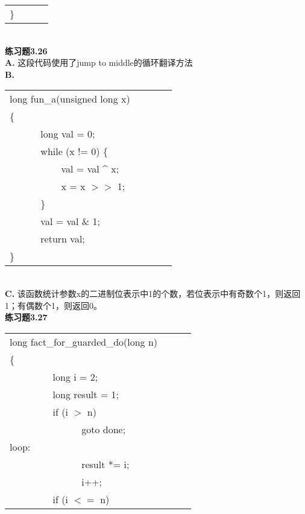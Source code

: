 \documentclass{article}
\begin{document}
\begin{CJK}{UTF8}{uyhei}
\begin{table}[ht]
\begin{tabular}{m{2em}m{2em}m{2em}l}
\}	\\
\end{tabular}
\end{table}	\\
\textbf{练习题3.26}	\\[1ex]
\textbf{A. }这段代码使用了jump to middle的循环翻译方法	\\
\newpage
\noindent\textbf{B. }	\\[-3ex]
\begin{table}[htbp]
\begin{tabular}{m{2em}m{2em}m{2em}l}
	\multicolumn{3}{l}{long fun\_a(unsigned long x)}	\\
\{	\\
	&	\multicolumn{3}{l}{long val = 0;}	\\
	&	\multicolumn{3}{l}{ while (x != 0) \{ } 	\\
	&	&	\multicolumn{2}{l}{val = val \^{} x;}	\\
	&	&	\multicolumn{2}{l}{x = x $>>$ 1;}	\\
	&	\multicolumn{3}{l}{ \} } 	\\
	&	\multicolumn{3}{l}{val = val \& 1;} 	\\
	&	\multicolumn{3}{l}{return val;} 	\\
\}	\\
\end{tabular}
\end{table}	\\
\textbf{C. }该函数统计参数x的二进制位表示中1的个数，若位表示中有奇数个1，则返回1；有偶数个1，则返回0。	\\[2ex]
\textbf{练习题3.27}	\\[-3ex]
\begin{table}[ht]
\begin{tabular}{m{2em}m{2em}m{2em}l}
	\multicolumn{3}{l}{long fact\_for\_guarded\_do(long n)}	\\
\{	\\
	&	\multicolumn{3}{l}{long i = 2;}	\\
	&	\multicolumn{3}{l}{long result = 1;}	\\
	&	\multicolumn{3}{l}{ if (i $>$ n)  } 	\\
	&	&	\multicolumn{2}{l}{goto done;} 	\\
	\multicolumn{3}{l}{loop:} 	\\
	&	&	\multicolumn{2}{l}{result *= i;}	\\
	&	&	\multicolumn{2}{l}{i++;}	\\
	&	\multicolumn{3}{l}{if (i $<=$ n)}	\\

\end{tabular}
\end{table}
\end{CJK}
\end{document}
